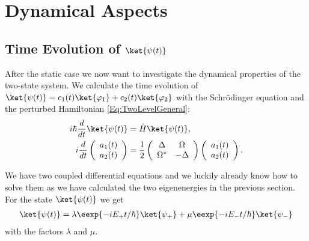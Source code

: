\section{Dynamical Aspects}
\subsection{Time Evolution of $\ket{\psi(t)}$}
 After the static case we now want to investigate the dynamical properties of the two-state system. We calculate the time evolution of $\ket{\psi(t)} = c_1(t)\ket{\varphi_1} + c_2(t)\ket{\varphi_2}$ with the Schrödinger equation and the perturbed Hamiltonian \eqref{Eq:TwoLevelGeneral}:
\begin{align}
i\hbar \frac{d}{dt}\ket{\psi(t)}&=\hat{H}\ket{\psi(t)},\\
i \frac{d}{dt}\left(\begin{array}{c} a_1(t) \\ a_2(t) \end{array}\right) &= \frac{1}{2}\left( \begin{array}{cc} \Delta & \Omega \\ \Omega^* & -\Delta \end{array} \right) \left(\begin{array}{c} a_1(t) \\ a_2(t) \end{array} \right).
\end{align}

We have two coupled differential equations and we luckily already know how to solve them as we have calculated the two eigenenergies in the previous section. For the state $\ket{\psi(t)}$ we get
\begin{align}
 \ket{\psi(t)}=\lambda \eexp{-i{E_+}t/{\hbar}} \ket{\psi_+} + \mu \eexp{-i{E_-}t/{\hbar}} \ket{\psi_-} \label{eq:psitimeevolution}
\end{align}
with the factors $\lambda$ and $\mu$.

